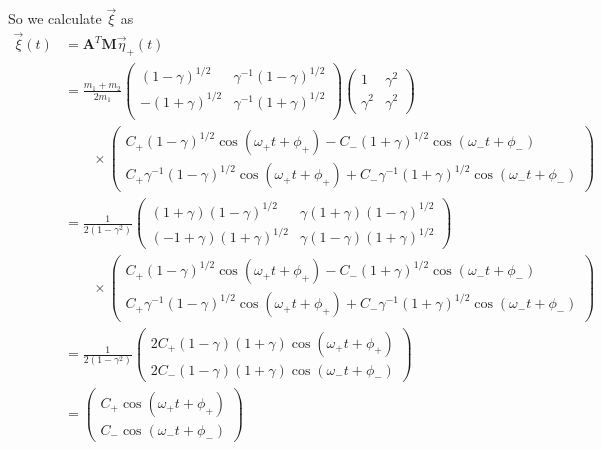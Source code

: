 \documentclass[11pt]{article}
\numberwithin{equation}{section}
\begin{document}
\begin{enumerate}[(a)]
So we calculate $\vec{\xi}$ as 
\begin{align*}
\vec{\xi}(t) &= \mathbf{A}^T\mathbf{M}\vec{\eta}_{+}(t)\\
&=\frac{m_1+m_2}{2m_1}
    \left(\begin{array}{cc} 
         (1-\gamma)^{1/2}          &\gamma^{-1}(1-\gamma)^{1/2}\\
         -(1+\gamma)^{1/2}         &\gamma^{-1}(1+\gamma)^{1/2}\\
     \end{array}\right)
     \left(\begin{array}{cc}
        1             &\gamma^2\\
        \gamma^2      &\gamma^2
    \end{array}\right)\\
&\qquad\times    \left(\begin{array}{c} 
         C_+(1-\gamma)^{1/2}\cos(\omega_{+}t+\phi_{+})-C_-(1+\gamma)^{1/2}\cos(\omega_{-}t+\phi_{-})\\ 
         C_+\gamma^{-1}(1-\gamma)^{1/2}\cos(\omega_{+}t+\phi_{+})+C_-\gamma^{-1}(1+\gamma)^{1/2}\cos(\omega_{-}t+\phi_{-})
    \end{array}\right)\\
&=\frac{1}{2(1-\gamma^2)}
    \left(\begin{array}{cc} 
         (1+\gamma)(1-\gamma)^{1/2}          &\gamma(1+\gamma)(1-\gamma)^{1/2}\\
         (-1+\gamma)(1+\gamma)^{1/2}         &\gamma(1-\gamma)(1+\gamma)^{1/2}
     \end{array}\right)\\
&\qquad\times    \left(\begin{array}{c} 
         C_+(1-\gamma)^{1/2}\cos(\omega_{+}t+\phi_{+})-C_-(1+\gamma)^{1/2}\cos(\omega_{-}t+\phi_{-})\\ 
         C_+\gamma^{-1}(1-\gamma)^{1/2}\cos(\omega_{+}t+\phi_{+})+C_-\gamma^{-1}(1+\gamma)^{1/2}\cos(\omega_{-}t+\phi_{-})
    \end{array}\right)\\
&=\frac{1}{2(1-\gamma^2)}
    \left(\begin{array}{c} 
         2C_+(1-\gamma)(1+\gamma)\cos(\omega_{+}t+\phi_{+})\\
         2C_-(1-\gamma)(1+\gamma)\cos(\omega_{-}t+\phi_{-})
    \end{array}\right)\\
&= \left(\begin{array}{c} 
         C_+\cos(\omega_{+}t+\phi_{+})\\
         C_-\cos(\omega_{-}t+\phi_{-})
    \end{array}\right)
\end{align*}


\end{enumerate}
\end{document}
